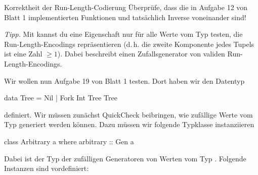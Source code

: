 \documentclass{uebblatt}
\newcommand{\refaufgabe}[1]{#1} %
\begin{document}
\begin{aufgabe}{Korrektheit der Run-Length-Codierung}
  Überprüfe, dass die in Aufgabe \refaufgabe{12} von Blatt 1 implementierten
  Funktionen  und  tatsächlich
  Inverse voneinander sind!

  {\scriptsize \emph{Tipp.} Mit  kannst du eine Eigenschaft nur
  für alle Werte vom Typ 
  testen, die Run-Length-Encodings repräsentieren (d.\,h. die zweite Komponente
  jedes Tupels ist eine Zahl $\geq 1$). Dabei beschreibt
   einen Zufallsgenerator von validen
  Run-Length-Encodings.}
\end{aufgabe}

Wir wollen nun Aufgabe \refaufgabe{19} von Blatt 1 testen. Dort haben wir den
Datentyp

\begin{haskellcode}
data Tree = Nil | Fork Int Tree Tree
\end{haskellcode}

definiert. Wir müssen zunächst QuickCheck beibringen, wie zufällige Werte vom Typ  generiert werden können. Dazu müssen wir folgende Typklasse instanziieren

\begin{haskellcode}
class Arbitrary a where
  arbitrary :: Gen a
\end{haskellcode}

Dabei ist  der Typ der zufälligen Generatoren von Werten
vom Typ . Folgende Instanzen sind vordefiniert:

\end{document}
